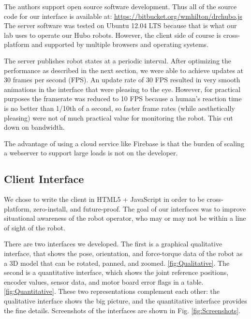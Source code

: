 \documentclass[letterpaper, 10 pt, conference]{ieee/ieeeconf}  %
\begin{document}
The authors support open source software development.
Thus all of the source code for our interface is available at: \url{https://bitbucket.org/wmhilton/drchubo.js}
The server software was tested on Ubuntu 12.04 LTS because that is what our lab uses to operate our Hubo robots.
However, the client side of course is cross-platform and supported by multiple browsers and operating systems.

The server publishes robot states at a periodic interval.
After optimizing the performance as described in the next section, we were able to achieve updates at 30 frames per second (FPS).
An update rate of 30 FPS resulted in very smooth animations in the interface that were pleasing to the eye.
However, for practical purposes the framerate was reduced to 10 FPS because a human's reaction time is no better than 1/10th of a second, so faster frame rates (while aesthetically pleasing) were not of much practical value for monitoring the robot. \cite{kosinski2008literature}
This cut down on bandwidth.

The advantage of using a cloud service like Firebase is that the burden of scaling a webserver to support large loads is not on the developer.

\subsection{Client Interface}
We chose to write the client in HTML5 + JavaScript in order to be cross-platform, zero-install, and future-proof.
The goal of our interfaces was to improve situational awareness of the robot operator, who may or may not be within a line of sight of the robot.

There are two interfaces we developed.
The first is a graphical qualitative interface, that shows the pose, orientation, and force-torque data of the robot as a 3D model that can be rotated, panned, and zoomed. \ref{fig:Qualitative}.
The second is a quantitative interface, which shows the joint reference positions, encoder values, sensor data, and motor board error flags in a table. \ref{fig:Quantitative}.
These two representations complement each other: the qualitative interface shows the big picture, and the quantitative interface provides the fine details.
Screenshots of the interfaces are shown in Fig. \ref{fig:Screenshots}.
\end{document}
